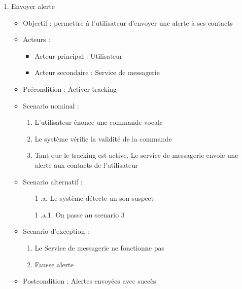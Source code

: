 \begin{enumerate}[label=\alph*.]
	\item Envoyer alerte
	\begin{itemize}
		\item Objectif : permettre à l’utilisateur d’envoyer une alerte à ses contacts
		\item Acteurs :
		\begin{itemize}
			\item Acteur principal : Utilisateur
			\item Acteur secondaire : Service de messagerie
		\end{itemize}
		\item Précondition : Activer tracking
		\item Scenario nominal :
		\begin{enumerate}[label=\arabic*.]
			\item L’utilisateur énonce une commande vocale
			\item Le système vérifie la validité de la commande
			\item Tant que le tracking est active, Le service de messagerie envoie une alerte aux contacts de l’utilisateur
		\end{enumerate}
		\item Scenario alternatif :
		\begin{enumerate}[label=\arabic*.]
			\item[1] .a. Le système détecte un son suspect
			\item[1] .a.1. On passe au scenario 3
		\end{enumerate}
		\item Scenario d’exception : 
		\begin{enumerate}[label=\arabic*.]
			\item Le Service de messagerie ne fonctionne pas
			\item Fausse alerte
		\end{enumerate}
		\item Postcondition : Alertes envoyées avec succès
	\end{itemize}
	

\end{enumerate}
